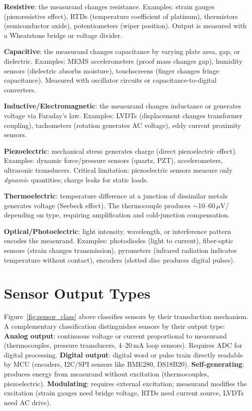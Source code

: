 \textbf{Resistive}: the measurand changes resistance. Examples: strain gauges (piezoresistive effect), RTDs (temperature coefficient of platinum), thermistors (semiconductor oxide), potentiometers (wiper position). Output is measured with a Wheatstone bridge or voltage divider.

\textbf{Capacitive}: the measurand changes capacitance by varying plate area, gap, or dielectric. Examples: MEMS accelerometers (proof mass changes gap), humidity sensors (dielectric absorbs moisture), touchscreens (finger changes fringe capacitance). Measured with oscillator circuits or capacitance-to-digital converters.

\textbf{Inductive/Electromagnetic}: the measurand changes inductance or generates voltage via Faraday's law. Examples: LVDTs (displacement changes transformer coupling), tachometers (rotation generates AC voltage), eddy current proximity sensors.

\textbf{Piezoelectric}: mechanical stress generates charge (direct piezoelectric effect). Examples: dynamic force/pressure sensors (quartz, PZT), accelerometers, ultrasonic transducers. Critical limitation: piezoelectric sensors measure only \emph{dynamic} quantities; charge leaks for static loads.

\textbf{Thermoelectric}: temperature difference at a junction of dissimilar metals generates voltage (Seebeck effect). The thermocouple produces $\sim$10--60\,$\mu$V/\degC{} depending on type, requiring amplification and cold-junction compensation.

\textbf{Optical/Photoelectric}: light intensity, wavelength, or interference pattern encodes the measurand. Examples: photodiodes (light to current), fiber-optic sensors (strain changes transmission), pyrometers (infrared radiation indicates temperature without contact), encoders (slotted disc produces digital pulses).

\section{Sensor Output Types}
Figure~\ref{fig:sensor_class} above classifies sensors by their transduction mechanism. A complementary classification distinguishes sensors by their output type:
\textbf{Analog output}: continuous voltage or current proportional to measurand (thermocouples, pressure transducers, 4--20\,mA loop sensors). Requires ADC for digital processing. \textbf{Digital output}: digital word or pulse train directly readable by MCU (encoders, I2C/SPI sensors like BME280, DS18B20). \textbf{Self-generating}: produces energy from measurand without excitation (thermocouples, piezoelectric). \textbf{Modulating}: requires external excitation; measurand modifies the excitation (strain gauges need bridge voltage, RTDs need current source, LVDTs need AC drive).

